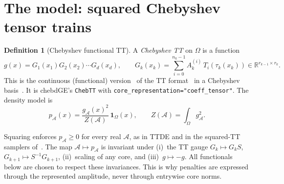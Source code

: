 \documentclass[11pt]{article}
\theoremstyle{definition}
\newtheorem{definition}[proposition]{Definition}
\theoremstyle{remark}
\newcommand{\R}{\mathbb{R}}
\begin{document}
\section{The model: squared Chebyshev tensor trains}
\label{sec:model}

\begin{definition}[Chebyshev functional TT]
A \emph{Chebyshev TT} on $\Omega$ is a function
\begin{equation}\label{eq:chebtt}
  g(x)=G_1(x_1)G_2(x_2)\cdots G_d(x_d),\qquad G_k(x_k)=\sum_{i=0}^{n_k-1}A_k^{(i)}\,T_i(\tau_k(x_k))\in\R^{r_{k-1}\times r_k}.
\end{equation}
This is the continuous (functional) version~\cite{gorodetsky2019continuous,bigoni2016spectral} of the TT format~\cite{oseledets2011tt} in a Chebyshev
basis~\cite{trefethen2019atap}. It is chebdGE's \texttt{ChebTT} with \texttt{core\_representation="coeff\_tensor"}.
The density model is
\begin{equation}\label{eq:density}
  p_{\mathcal A}(x)=\frac{g_{\mathcal A}(x)^2}{Z(\mathcal A)}\,\mathbf 1_\Omega(x),\qquad Z(\mathcal A)=\int_\Omega g_{\mathcal A}^2.
\end{equation}
\end{definition}

Squaring enforces $p_{\mathcal A}\ge 0$ for every real $\mathcal A$, as in TTDE and in the squared-TT samplers
of~\cite{dolgov2020approximation,cui2022deep}. The map $\mathcal A\mapsto p_{\mathcal A}$ is invariant under
(i)~the TT gauge $G_k\mapsto G_kS$, $G_{k+1}\mapsto S^{-1}G_{k+1}$, (ii)~scaling of any core, and (iii)~$g\mapsto -g$.
All functionals below are chosen to respect these invariances. This is why penalties are expressed through the
represented amplitude, never through entrywise core norms.
\end{document}
